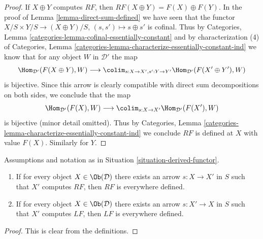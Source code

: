 \begin{proof}
If $X \oplus Y$ computes $RF$, then $RF(X \oplus Y) = F(X) \oplus F(Y)$.
In the proof of Lemma \ref{lemma-direct-sum-defined} we have seen that
the functor $X/S \times Y/S \to (X \oplus Y)/S$, $(s, s') \mapsto s \oplus s'$
is cofinal. Thus by Categories, Lemma
\ref{categories-lemma-cofinal-essentially-constant} and by
characterization (4) of Categories, Lemma
\ref{categories-lemma-characterize-essentially-constant-ind}
we know that for any object $W$ in $\mathcal{D}'$ the map
$$
\Hom_{\mathcal{D}'}(F(X \oplus Y), W)
\longrightarrow
\colim_{s : X \to X', s' : Y \to Y'} \Hom_{\mathcal{D}'}(F(X' \oplus Y'), W)
$$
is bijective. Since this arrow is clearly compatible with direct sum
decompositions on both sides, we conclude that the map
$$
\Hom_{\mathcal{D}'}(F(X), W)
\longrightarrow
\colim_{s : X \to X'} \Hom_{\mathcal{D}'}(F(X'), W)
$$
is bijective (minor detail omitted). Thus by 
Categories, Lemma \ref{categories-lemma-characterize-essentially-constant-ind}
we conclude $RF$ is defined at $X$ with value $F(X)$.
Similarly for $Y$.
\end{proof}

\begin{lemma}
\label{lemma-existence-computes}
Assumptions and notation as in
Situation \ref{situation-derived-functor}.
\begin{enumerate}
\item If for every object $X \in \Ob(\mathcal{D})$
there exists an arrow $s : X \to X'$ in $S$ such that $X'$ computes
$RF$, then $RF$ is everywhere defined.
\item If for every object $X \in \Ob(\mathcal{D})$
there exists an arrow $s : X' \to X$ in $S$ such that $X'$ computes
$LF$, then $LF$ is everywhere defined.
\end{enumerate}
\end{lemma}

\begin{proof}
This is clear from the definitions.
\end{proof}

